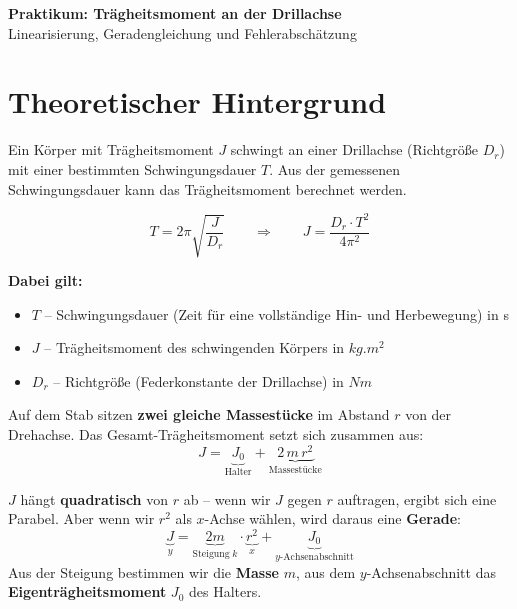 \documentclass[11pt,a4paper]{scrartcl}
\begin{document}
\begin{center}
	{\LARGE\bfseries Praktikum: Trägheitsmoment an der Drillachse}\\[0.5cm]
	{\large Linearisierung, Geradengleichung und Fehlerabschätzung}
\end{center}

\vspace{0.5cm}

\section*{Theoretischer Hintergrund}

Ein Körper mit Trägheitsmoment $J$ schwingt an einer Drillachse (Richtgröße $D_r$) mit einer bestimmten Schwingungsdauer $T$. Aus der gemessenen Schwingungsdauer kann das Trägheitsmoment berechnet werden.

\begin{formelbox}[title={\faIcon{square-root-alt} Schwingungsdauer der Drillachse}]
	\[T = 2\pi \sqrt{\frac{J}{D_r}} \qquad\Longrightarrow\qquad J = \frac{D_r \cdot T^2}{4\pi^2}\]

	\textbf{Dabei gilt:}
	\begin{itemize}
		\item $T$ -- Schwingungsdauer (Zeit für eine vollständige Hin- und Herbewegung) in s
		\item $J$ -- Trägheitsmoment des schwingenden Körpers in $\si{kg.m^2}$
		\item $D_r$ -- Richtgröße (Federkonstante der Drillachse) in $\si{Nm}$
	\end{itemize}
\end{formelbox}

Auf dem Stab sitzen \textbf{zwei gleiche Massestücke} im Abstand $r$ von der Drehachse. Das Gesamt-Trägheitsmoment setzt sich zusammen aus:
\[
J = \underbrace{J_0}_{\text{Halter}} + \underbrace{2\,m\,r^2}_{\text{Massestücke}}
\]

\begin{infobox}[title={\faIcon{info-circle} Linearisierung -- Die Idee}]
	$J$ hängt \textbf{quadratisch} von $r$ ab -- wenn wir $J$ gegen $r$ auftragen, ergibt sich eine Parabel. Aber wenn wir $r^2$ als $x$-Achse wählen, wird daraus eine \textbf{Gerade}:
	\[
	\underbrace{J}_{y} = \underbrace{2m}_{\text{Steigung}\;k} \cdot \underbrace{r^2}_{x} + \underbrace{J_0}_{y\text{-Achsenabschnitt}}
	\]
	Aus der Steigung bestimmen wir die \textbf{Masse} $m$, aus dem $y$-Achsenabschnitt das \textbf{Eigenträgheitsmoment} $J_0$ des Halters.
\end{infobox}
\end{document}
